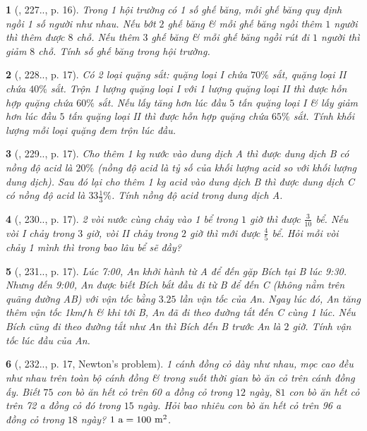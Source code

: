 \documentclass{article}
\newtheorem{baitoan}{}
\begin{document}
\begin{baitoan}[\cite{Binh_Toan_9_tap_2}, 227.., p. 16]
	Trong 1 hội trường có 1 số ghế băng, mỗi ghế băng quy định ngồi 1 số người như nhau. Nếu bớt $2$ ghế băng \& mỗi ghế băng ngồi thêm $1$ người thì thêm được $8$ chỗ. Nếu thêm $3$ ghế băng \& mỗi ghế băng ngồi rút đi $1$ người thì giảm $8$ chỗ. Tính số ghế băng trong hội trường.
\end{baitoan}

\begin{baitoan}[\cite{Binh_Toan_9_tap_2}, 228.., p. 17]
	Có 2 loại quặng sắt: quặng loại I chứa $70\%$ sắt, quặng loại II chứa $40\%$ sắt. Trộn 1 lượng quặng loại I với 1 lượng quặng loại II thì được hỗn hợp quặng chứa $60\%$ sắt. Nếu lấy tăng hơn lúc đầu $5$ tấn quặng loại I \& lấy giảm hơn lúc đầu $5$ tấn quặng loại II thì được hỗn hợp quặng chứa $65\%$ sắt. Tính khối lượng mỗi loại quặng đem trộn lúc đầu.
\end{baitoan}

\begin{baitoan}[\cite{Binh_Toan_9_tap_2}, 229.., p. 17]
	Cho thêm {\rm1 kg} nước vào dung dịch A thì được dung dịch B có nồng độ acid là $20\%$ (nồng độ acid là tỷ số của khối lượng acid so với khối lượng dung dịch). Sau đó lại cho thêm {\rm1 kg} acid vào dung dịch B thì được dung dịch C có nồng độ acid là $33\frac{1}{3}\%$. Tính nồng độ acid trong dung dịch A.
\end{baitoan}

\begin{baitoan}[\cite{Binh_Toan_9_tap_2}, 230.., p. 17]
	2 vòi nước cùng chảy vào 1 bể trong $1$ giờ thì được $\frac{3}{10}$ bể. Nếu vòi I chảy trong $3$ giờ, vòi II chảy trong $2$ giờ thì mới được $\frac{4}{5}$ bể. Hỏi mỗi vòi chảy 1 mình thì trong bao lâu bể sẽ đầy?
\end{baitoan}

\begin{baitoan}[\cite{Binh_Toan_9_tap_2}, 231.., p. 17]
	Lúc {\rm7:00}, An khởi hành từ A để đến gặp Bích tại B lúc {\rm9:30}. Nhưng đến {\rm9:00}, An được biết Bích bắt đầu đi từ B để đến C (không nằm trên quãng đường AB) với vận tốc bằng $3.25$ lần vận tốc của An. Ngay lúc đó, An tăng thêm vận tốc {\rm1km{\tt/}h} \& khi tới B, An đã đi theo đường tắt đến C cùng 1 lúc. Nếu Bích cũng đi theo đường tắt như An thì Bích đến B trước An là $2$ giờ. Tính vận tốc lúc đầu của An.
\end{baitoan}

\begin{baitoan}[\cite{Binh_Toan_9_tap_2}, 232.., p. 17, Newton's problem]
	1 cánh đồng cỏ dày như nhau, mọc cao đều như nhau trên toàn bộ cánh đồng \& trong suốt thời gian bò ăn cỏ trên cánh đồng ấy. Biết $75$ con bò ăn hết cỏ trên {\rm60 a} đồng cỏ trong $12$ ngày, $81$ con bò ăn hết cỏ trên {\rm72 a} đồng cỏ đó trong $15$ ngày. Hỏi bao nhiêu con bò ăn hết cỏ trên {\rm96 a} đồng cỏ trong $18$ ngày? $\rm1\ a = 100\ m^2$.
\end{baitoan}
\end{document}
